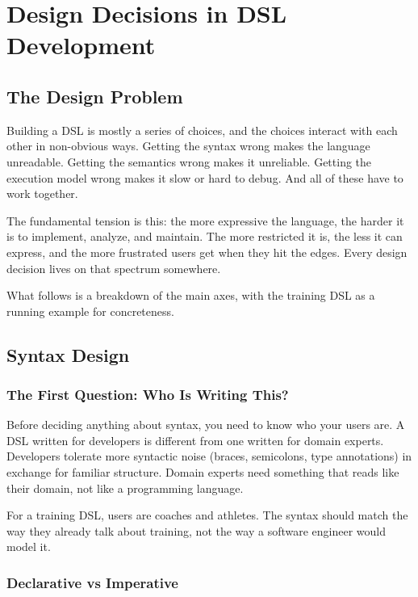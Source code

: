 \section{Design Decisions in DSL Development}

\subsection{The Design Problem}

Building a DSL is mostly a series of choices, and the choices interact with each other in
non-obvious ways. Getting the syntax wrong makes the language unreadable. Getting the
semantics wrong makes it unreliable. Getting the execution model wrong makes it slow or
hard to debug. And all of these have to work together.

The fundamental tension is this: the more expressive the language, the harder it is to
implement, analyze, and maintain. The more restricted it is, the less it can express, and
the more frustrated users get when they hit the edges. Every design decision lives on
that spectrum somewhere.

What follows is a breakdown of the main axes, with the training DSL as a running example
for concreteness.

\subsection{Syntax Design}

\subsubsection{The First Question: Who Is Writing This?}

Before deciding anything about syntax, you need to know who your users are. A DSL written
for developers is different from one written for domain experts. Developers tolerate more
syntactic noise (braces, semicolons, type annotations) in exchange for familiar structure.
Domain experts need something that reads like their domain, not like a programming language.

For a training DSL, users are coaches and athletes. The syntax should match the way they
already talk about training, not the way a software engineer would model it.

\subsubsection{Declarative vs Imperative}

